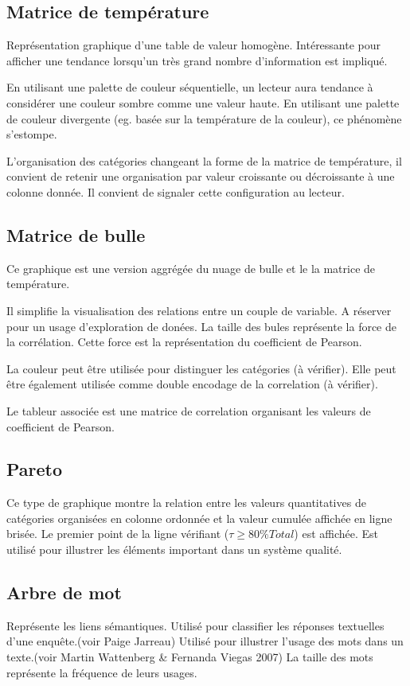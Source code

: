 \documentclass[a4paper,12pt]{article}
\begin{document}
\begin{multicols}{2}
\subsection*{Matrice de température}
\label{sec:orgaa4163b}
Représentation graphique d'une table de valeur homogène.\autocite{sosulskiIIIGraphics2019}
Intéressante pour afficher une tendance lorsqu'un très grand nombre d'information est impliqué.

En utilisant une palette de couleur séquentielle, un lecteur aura tendance à considérer une couleur sombre comme une valeur haute. En utilisant une palette de couleur divergente (eg. basée sur la température de la couleur), ce phénomène s'estompe.

L'organisation des catégories changeant la forme de la matrice de température, il convient de retenir une organisation par valeur croissante ou décroissante à une colonne donnée. Il convient de signaler cette configuration au lecteur.\autocite{wilke6VisualizingAmounts2019}
\subsection*{Matrice de bulle}
\label{sec:org8681523}
Ce graphique est une version aggrégée du nuage de bulle et le la matrice de température.

Il simplifie la visualisation des relations entre un couple de variable. A réserver pour un usage d'exploration de donées.\autocite{sosulskiIIIGraphics2019} La taille des bules représente la force de la corrélation. Cette force est la représentation du coefficient de Pearson.\autocite{jonathanschwabish8Relationship2021}

La couleur peut être utilisée pour distinguer les catégories (à vérifier). Elle peut être également utilisée comme double encodage de la correlation (à vérifier).

Le tableur associée est une matrice de correlation organisant les valeurs de coefficient de Pearson.
\subsection*{Pareto}
\label{sec:org5ee5d7c}
Ce type de graphique montre la relation entre les valeurs quantitatives de catégories organisées en colonne ordonnée et la valeur cumulée affichée en ligne brisée. Le premier point de la ligne vérifiant (\(\tau\geq80\%Total\)) est affichée. Est utilisé pour illustrer les éléments important dans un système qualité.
\subsection*{Arbre de mot}
\label{sec:org039e953}
Représente les liens sémantiques. Utilisé pour classifier les réponses textuelles d'une enquête.(voir Paige Jarreau) Utilisé pour illustrer l'usage des mots dans un texte.(voir Martin Wattenberg \& Fernanda Viegas 2007) La taille des mots représente la fréquence de leurs usages.\autocite{jonathanschwabish10Qualitative2021}

\end{multicols}
\end{document}
